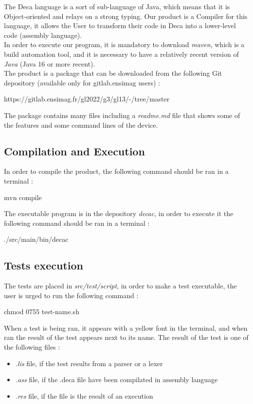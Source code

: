 The Deca language is a sort of sub-language of Java, which means that it is Object-oriented and relays on a strong typing. Our product is a Compiler for this language, it allows the User to transform their code in Deca into a lower-level code (assembly language). \\

In order to execute our program, it is mandatory to download \textit{maven}, which is a build automation tool, and it is necessary to have a relatively recent version of \textit{Java} (Java 16 or more recent). \\

The product is a package that can be downloaded from the following Git depository (available only for gitlab.ensimag users) : 
\begin{center}
https://gitlab.ensimag.fr/gl2022/g3/gl13/-/tree/master
\end{center}

The package contains many files including a \textit{readme.md} file that shows some of the features and some command lines of the device.

\subsection{Compilation and Execution}

In order to compile the product, the following command should be ran in a terminal : 
\begin{center}
    mvn compile
\end{center}

The executable program is in the depository \textit{decac}, in order to execute it  the following command should be ran in a terminal :
\begin{center}
    ./src/main/bin/decac
\end{center}

\subsection{Tests execution}

The tests are placed in \textit{src/test/script}, in order to make a test executable, the user is urged to run the following command : 
\begin{center}
    chmod 0755 test-name.sh
\end{center}

When a test is being ran, it appears with a yellow font in the terminal, and when ran the result of the test appears next to its name. The result of the test is one of the following files : \begin{itemize}
    \item \textit{.lis} file, if the test results from a parser or a lexer
    \item \textit{.ass} file, if the .deca file have been compilated in assembly language
    \item \textit{.res} file, if the file is the result of an execution
\end{itemize} 

